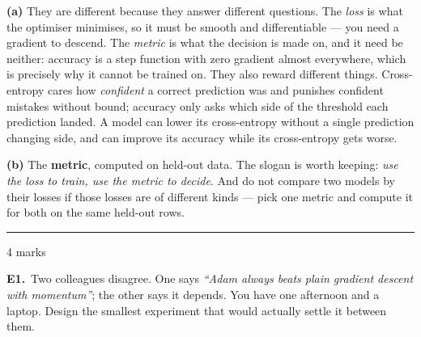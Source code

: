 \documentclass[10pt,a4paper]{article}
\newcommand{\parthead}[2]{\vspace{2pt}\noindent\rule{\linewidth}{0.4pt}\par\vspace{2pt}%
  \noindent{\bfseries Part #1}\hfill{\small #2}\par\vspace{1pt}}
\begin{document}
\textbf{(a)} They are different because they answer different questions. The \emph{loss} is what the optimiser minimises, so it must be smooth and differentiable --- you need a gradient to descend. The \emph{metric} is what the decision is made on, and it need be neither: accuracy is a step function with zero gradient almost everywhere, which is precisely why it cannot be trained on. They also reward different things. Cross-entropy cares how \emph{confident} a correct prediction was and punishes confident mistakes without bound; accuracy only asks which side of the threshold each prediction landed. A model can lower its cross-entropy without a single prediction changing side, and can improve its accuracy while its cross-entropy gets worse.\par\vspace{1mm}\textbf{(b)} The \textbf{metric}, computed on held-out data. The slogan is worth keeping: \emph{use the loss to train, use the metric to decide}. And do not compare two models by their losses if those losses are of different kinds --- pick one metric and compute it for both on the same held-out rows.

\newpage

\parthead{E --- Reasoning}{4 marks}

\textbf{E1.}\ Two colleagues disagree. One says \emph{``Adam always beats plain gradient descent with momentum''};
the other says it depends. You have one afternoon and a laptop. Design the smallest experiment that would
actually settle it between them.

\vspace{4pt}
\end{document}
